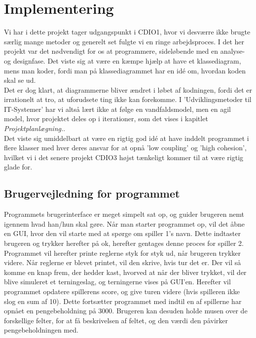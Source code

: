 \chapter{Implementering}
Vi har i dette projekt tager udgangspunkt i CDIO1, hvor vi desværre ikke brugte særlig mange metoder og generelt set fulgte vi en ringe arbejdsproces.
I det her projekt var det nødvendigt for os at programmere, sideløbende med en analyse- og designfase.
Det viste sig at være en kæmpe hjælp at have et klassediagram, mens man koder, fordi man på klassediagrammet har en idé om, hvordan koden skal se ud.
\\
Det er dog klart, at diagrammerne bliver ændret i løbet af kodningen, fordi det er irrationelt at tro, at uforudsete ting ikke kan forekomme.
I 'Udviklingsmetoder til IT-Systemer' har vi altså lært ikke at følge en vandfaldsmodel, men en agil model, hvor projektet deles op i iterationer, som det vises i kapitlet \textit{Projektplanlægning.}.
\\
Det viste sig umiddelbart at være en rigtig god idé at have inddelt programmet i flere klasser med hver deres ansvar for at opnå 'low coupling' og 'high cohesion', hvilket vi i det senere projekt CDIO3 højst tænkeligt kommer til at være rigtig glade for.

\section{Brugervejledning for programmet}
Programmets brugerinterface er meget simpelt sat op, og guider brugeren nemt igennem hvad han/hun skal gøre.
Når man starter programmet op, vil det åbne en GUI, hvor den vil starte med at spørge om spiller 1's navn.
Dette indtaster brugeren og trykker herefter på ok, herefter gentages denne proces for spiller 2.
Programmet vil herefter printe reglerne styk for styk ud, når brugeren trykker videre.
Når reglerne er blevet printet, vil den skrive, hvis tur det er.
Der vil så komme en knap frem, der hedder kast, hvorved at når der bliver trykket, vil der blive simuleret et terningeslag, og terningerne vises på GUI'en.
Herefter vil programmet opdatere spillerens score, og give turen videre (hvis spilleren ikke slog en sum af 10).
Dette fortsætter programmet med indtil en af spillerne har opnået en pengebeholdning på 3000.
Brugeren kan desuden holde musen over de forskellige felter, for at få beskrivelsen af feltet, og den værdi den påvirker pengebeholdningen med.